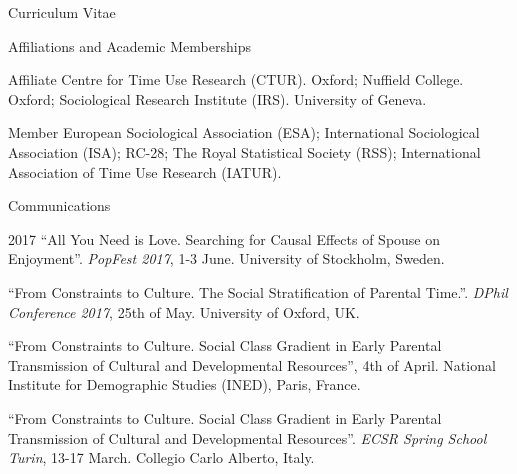 \documentclass[12pt,a4paper]{article}
\begin{document}
\begin{cv}{Curriculum Vitae}
\begin{cvlist}{Affiliations and Academic Memberships}
	\item[Affiliate] Centre for Time Use Research (CTUR). Oxford; Nuffield College. Oxford; Sociological Research Institute (IRS). University of Geneva. 
	\item[Member] European Sociological Association (ESA); International Sociological Association (ISA); RC-28; The Royal Statistical Society (RSS); International Association of Time Use Research (IATUR). 
\end{cvlist}

\begin{cvlist}{Communications}
	\item[2017] ``All You Need is Love. Searching for Causal Effects of Spouse on Enjoyment''. \emph{PopFest 2017}, 1-3 June. University of Stockholm, Sweden. 
	
	\item[] ``From Constraints to Culture.
The Social Stratification of Parental Time.''. \emph{DPhil Conference 2017}, 25th of May. University of Oxford, UK. 
	
	\item[]  ``From Constraints to Culture. Social Class Gradient in Early Parental Transmission of Cultural and Developmental Resources'', 4th of April. National Institute for Demographic Studies (INED), Paris, France. 
	
	\item[]  ``From Constraints to Culture. Social Class Gradient in Early Parental Transmission of Cultural and Developmental Resources''. \emph{ECSR Spring School Turin}, 13-17 March. Collegio Carlo Alberto, Italy. 
	

\end{cvlist}
\end{cv}
\end{document}
